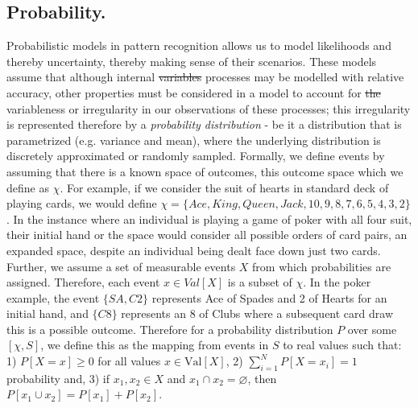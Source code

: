 \documentclass[7pt]{article}
\begin{document}
\subsection{Probability.}



{Probabilistic models} in pattern recognition allows us to model likelihoods and thereby uncertainty, thereby making sense of their scenarios. These models assume that although internal \st{variables} processes may be modelled with relative accuracy, other properties must be considered in a model to account for \st{the} variableness or irregularity in our observations of these processes; this irregularity is represented therefore by a \emph{probability distribution} - be it a distribution that is parametrized (e.g. variance and mean), where the underlying distribution is discretely approximated or randomly sampled. Formally, we define events by assuming that there is a known space of outcomes, this outcome space which we define as $\chi$. For example, if we consider the suit of hearts in standard deck of playing cards, we would define $\chi = \{Ace, King, Queen, Jack, 10, 9, 8, 7, 6, 5, 4, 3, 2\}$. In the instance where an individual is playing a game of poker with all four suit, their initial hand or the space would consider all possible orders of card pairs, an expanded space, despite an individual being dealt face down just two cards. Further, we assume a set of measurable events $X$ from which probabilities are assigned.  Therefore, each event $x \in Val[X]$ is a subset of $\chi$. In the poker example, 
the event $\{SA, C2 \}$ represents Ace of Spades and 2 of Hearts for an initial hand, and $\{C8\}$ represents an 8 of Clubs where a subsequent card draw this is a possible outcome.  Therefore for a probability distribution $P$ over some $[\chi,S]$, we define this as the mapping from events in $S$ to real values such that: 1) $P[X = x] \geq 0$ for all values $x \in \text{Val}[X]$, 2) $\sum_{i=1}^N P[X = x_i ] = 1$ probability and, 3) if $x_1, x_2 \in X$ and $x_1 \cap x_2 = \varnothing$, then $P[x_1 \cup x_2] = P[x_1] + P[x_2] $.
\end{document}
